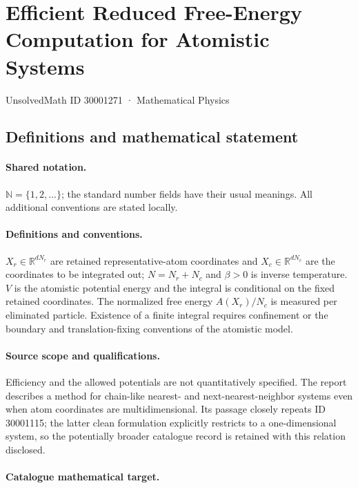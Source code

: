 \documentclass[11pt]{article}
\begin{document}
\setcounter{section}{30001270}
\section{Efficient Reduced Free-Energy Computation for Atomistic Systems}\label{30001271}
{\small UnsolvedMath ID 30001271 · Mathematical Physics}
\subsection{Definitions and mathematical statement}

\paragraph{Shared notation.}$\mathbb N=\{1,2,\ldots\}$; the standard number fields have their usual meanings. All additional conventions are stated locally.


\paragraph{Definitions and conventions.} $X_r\in\mathbb R^{dN_r}$ are retained representative-atom coordinates and $X_c\in\mathbb R^{dN_c}$ are the coordinates to be integrated out; $N=N_r+N_c$ and $\beta>0$ is inverse temperature. $V$ is the atomistic potential energy and the integral is conditional on the fixed retained coordinates. The normalized free energy $A(X_r)/N_c$ is measured per eliminated particle. Existence of a finite integral requires confinement or the boundary and translation-fixing conventions of the atomistic model.

\paragraph{Source scope and qualifications.} Efficiency and the allowed potentials are not quantitatively specified. The report describes a method for chain-like nearest- and next-nearest-neighbor systems even when atom coordinates are multidimensional. Its passage closely repeats ID 30001115; the latter clean formulation explicitly restricts to a one-dimensional system, so the potentially broader catalogue record is retained with this relation disclosed.

\paragraph{Catalogue mathematical target.}
\end{document}
